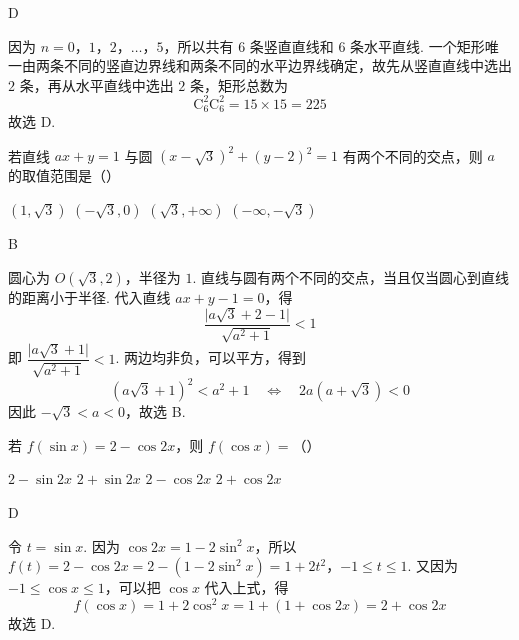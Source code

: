 \begin{answer}
D
\end{answer}

\begin{solution}
因为 \(n=0\)，\(1\)，\(2\)，\(\ldots\)，\(5\)，所以共有 \(6\) 条竖直直线和 \(6\) 条水平直线. 一个矩形唯一由两条不同的竖直边界线和两条不同的水平边界线确定，故先从竖直直线中选出 \(2\) 条，再从水平直线中选出 \(2\) 条，矩形总数为
\[
\mathrm C_{6}^{2}\mathrm C_{6}^{2}=15\times15=225
\]
故选 D.
\end{solution}

\begin{problem}
若直线 \(ax+y=1\) 与圆 \((x-\sqrt{3})^{2}+(y-2)^{2}=1\) 有两个不同的交点，则 \(a\) 的取值范围是（\quad）

\choices
    {\(\left(1,\sqrt{3}\right)\)}
    {\(\left(-\sqrt{3},0\right)\)}
    {\(\left(\sqrt{3},+\infty\right)\)}
    {\(\left(-\infty,-\sqrt{3}\right)\)}
\end{problem}

\begin{answer}
B
\end{answer}

\begin{solution}
圆心为 \(O(\sqrt{3},2)\)，半径为 \(1\). 直线与圆有两个不同的交点，当且仅当圆心到直线的距离小于半径. 代入直线 \(ax+y-1=0\)，得
\[
\frac{\lvert a\sqrt{3}+2-1\rvert}{\sqrt{a^{2}+1}}<1
\]
即 \(\dfrac{\lvert a\sqrt{3}+1\rvert}{\sqrt{a^{2}+1}}<1\). 两边均非负，可以平方，得到
\[
(a\sqrt{3}+1)^2<a^2+1
\quad\Longleftrightarrow\quad
2a(a+\sqrt{3})<0
\]
因此 \(-\sqrt{3}<a<0\)，故选 B.
\end{solution}

\begin{problem}
若 \(f(\sin x)=2-\cos2x\)，则 \(f(\cos x)=\)（\quad）

\choices
    {\(2-\sin2x\)}
    {\(2+\sin2x\)}
    {\(2-\cos2x\)}
    {\(2+\cos2x\)}
\end{problem}

\begin{answer}
D
\end{answer}

\begin{solution}
令 \(t=\sin x\). 因为 \(\cos2x=1-2\sin^{2}x\)，所以
\(f(t)=2-\cos2x=2-\left(1-2\sin^{2}x\right)=1+2t^{2}\)，\(-1\leqslant t\leqslant1\).
又因为 \(-1\leqslant\cos x\leqslant1\)，可以把 \(\cos x\) 代入上式，得
\[
f(\cos x)=1+2\cos^{2}x=1+\left(1+\cos2x\right)=2+\cos2x
\]
故选 D.
\end{solution}

